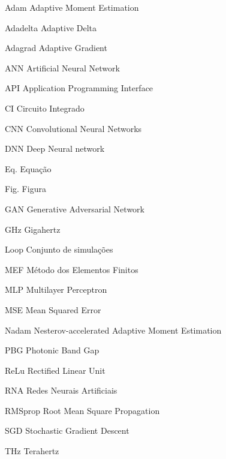 

\begin{siglas}
    \item[Adam] Adaptive Moment Estimation
    \item[Adadelta] Adaptive Delta
    \item[Adagrad] Adaptive Gradient
    \item[ANN] Artificial Neural Network 
    \item[API] Application Programming Interface
    
    \item[CI] Circuito Integrado
    \item[CNN] Convolutional Neural Networks
    
    \item[DNN] Deep Neural network

    \item[Eq.] Equação
    
    \item[Fig.] Figura
    
    \item[GAN] Generative Adversarial Network
    \item[GHz] Gigahertz

    \item[Loop] Conjunto de simulações

    \item[MEF] Método dos Elementos Finitos
    \item[MLP] Multilayer Perceptron
    \item[MSE] Mean Squared Error
    
    \item[Nadam] Nesterov-accelerated Adaptive Moment Estimation

    \item[PBG] Photonic Band Gap

    \item[ReLu] Rectified Linear Unit
    \item[RNA] Redes Neurais Artificiais
    \item[RMSprop] Root Mean Square Propagation

    \item[SGD] Stochastic Gradient Descent

    \item[THz] Terahertz
\end{siglas}
